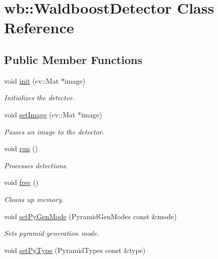 \hypertarget{classwb_1_1_waldboost_detector}{}\section{wb\+:\+:Waldboost\+Detector Class Reference}
\label{classwb_1_1_waldboost_detector}
\subsection*{Public Member Functions}
\begin{DoxyCompactItemize}
\item 
void \hyperlink{classwb_1_1_waldboost_detector_ab6cc8c1421a2b6fd514c8cb42f1f0ed4}{init} (cv\+::\+Mat $\ast$image)
\begin{DoxyCompactList}\small\item\em Initializes the detector. \end{DoxyCompactList}\item 
void \hyperlink{classwb_1_1_waldboost_detector_a56111c56b061abd651d51a8f886482f2}{set\+Image} (cv\+::\+Mat $\ast$image)
\begin{DoxyCompactList}\small\item\em Passes an image to the detector. \end{DoxyCompactList}\item 
void \hyperlink{classwb_1_1_waldboost_detector_adcd37445b984e3e48182d45eec76bb66}{run} ()
\begin{DoxyCompactList}\small\item\em Processes detections. \end{DoxyCompactList}\item 
void \hyperlink{classwb_1_1_waldboost_detector_a6e723e3d0e56b74aaa607c3fd7cc6064}{free} ()
\begin{DoxyCompactList}\small\item\em Cleans up memory. \end{DoxyCompactList}\item 
\hypertarget{classwb_1_1_waldboost_detector_a59f7b691d794aa02726a03a2bf8141e1}{}void \hyperlink{classwb_1_1_waldboost_detector_a59f7b691d794aa02726a03a2bf8141e1}{set\+Py\+Gen\+Mode} (Pyramid\+Gen\+Modes const \&mode)\label{classwb_1_1_waldboost_detector_a59f7b691d794aa02726a03a2bf8141e1}

\begin{DoxyCompactList}\small\item\em Sets pyramid generation mode. \end{DoxyCompactList}\item 
\hypertarget{classwb_1_1_waldboost_detector_acb94ff72991663cd181757adc5e8a954}{}void \hyperlink{classwb_1_1_waldboost_detector_acb94ff72991663cd181757adc5e8a954}{set\+Py\+Type} (Pyramid\+Types const \&type)\label{classwb_1_1_waldboost_detector_acb94ff72991663cd181757adc5e8a954}


\end{DoxyCompactItemize}
